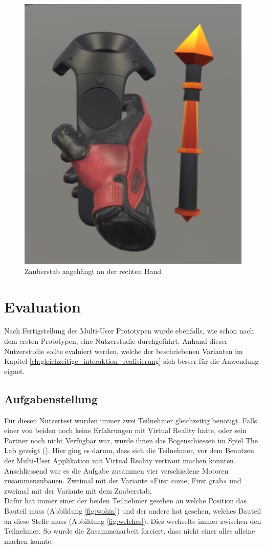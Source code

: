 \begin{figure}[h!]
	\centering
	\includegraphics[keepaspectratio,width=0.25\linewidth]{img/MagicWand.PNG}
	\caption{Zauberstab angehängt an der rechten Hand}
	\label{fig:magic_wand}
\end{figure} 

\pagebreak
\section{Evaluation}
Nach Fertigstellung des Multi-User Prototypen wurde ebenfalls, wie schon nach dem ersten Prototypen, eine Nutzerstudie durchgeführt. Anhand dieser Nutzerstudie sollte evaluiert werden, welche der beschriebenen Varianten im Kapitel \ref{ch:gleichzeitige_interaktion_realisierung} sich besser für die Anwendung eignet.

\subsection{Aufgabenstellung}
Für diesen Nutzertest wurden immer zwei Teilnehmer gleichzeitig benötigt. Falls einer von beiden noch keine Erfahrungen mit Virtual Reality hatte, oder sein Partner noch nicht Verfügbar war, wurde ihnen das Bogenschiessen im Spiel \grqq The Lab\grqq{} gezeigt (\cite{noauthor_lab_2019}). Hier ging es darum, dass sich die Teilnehmer, vor dem Benutzen der Multi-User Applikation mit Virtual Reality vertraut machen konnten. \\

\noindent Anschliessend war es die Aufgabe zusammen vier verschiedene Motoren zusammenzubauen. Zweimal mit der Variante «First come, First grab» und zweimal mit der Variante mit dem Zauberstab. \\
Dafür hat immer einer der beiden Teilnehmer gesehen an welche Position das Bauteil muss (Abbildung \ref{fig:wohin}) und der andere hat gesehen, welches Bauteil an diese Stelle muss (Abbildung \ref{fig:welches}). Dies wechselte immer zwischen den Teilnehmer. So wurde die Zusammenarbeit forciert, dass nicht einer alles alleine machen konnte.

